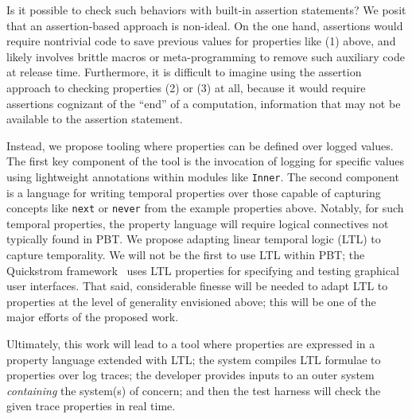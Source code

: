 Is it possible to check such behaviors with built-in assertion statements? We
posit that an assertion-based approach is non-ideal. On the one hand, assertions
would require nontrivial code to save previous values for properties like (1)
above, and likely involves brittle macros or meta-programming to remove such
auxiliary code at release time. Furthermore, it is difficult to imagine using
the assertion approach to checking properties (2) or (3) at all, because it
would require assertions cognizant of the ``end'' of a computation, information
that may not be available to the assertion statement.

Instead, we propose tooling where properties can be defined over logged values.
The first key component of the tool is the invocation of
logging for specific values using lightweight annotations within modules like
\lstinline{Inner}. The second component is a language for writing temporal
properties over those capable of capturing concepts like \lstinline{next} or
\lstinline{never} from the example properties above. Notably, for such temporal
properties, the property language will require logical connectives not typically
found in PBT. We propose adapting linear temporal logic (LTL) to capture
temporality. We will not be the first to use LTL within PBT; the Quickstrom
framework~\cite{oconnor_quickstrom_2022} uses LTL properties
for specifying and testing graphical user interfaces. That said, considerable
finesse will be needed to adapt LTL to properties at the level of generality
envisioned above; this will be one of the major efforts of the proposed work.

Ultimately, this work will lead to a tool where properties are expressed in a
property language extended with LTL; the system compiles LTL formulae to
properties over log traces; the developer provides inputs to an outer system
\emph{containing} the system(s) of concern; and then the test harness will check
the given trace properties in real time.


